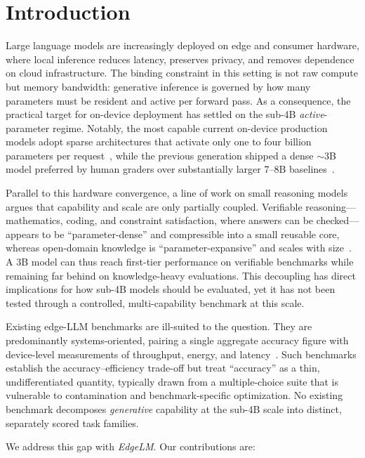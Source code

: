 \documentclass[runningheads]{llncs}
\begin{document}
\section{Introduction}

Large language models are increasingly deployed on edge and consumer
hardware, where local inference reduces latency, preserves privacy, and removes
dependence on cloud infrastructure. The binding constraint in this setting is
not raw compute but memory bandwidth: generative inference is governed by how
many parameters must be resident and active per forward pass. As a consequence,
the practical target for on-device deployment has settled on the sub-4B
\emph{active}-parameter regime. Notably, the most capable current on-device
production models adopt sparse architectures that activate only one to four
billion parameters per request~\cite{appleafm3}, while the previous generation
shipped a dense ${\sim}3$B model preferred by human graders over substantially
larger 7--8B baselines~\cite{appleafm2025}.

Parallel to this hardware convergence, a line of work on small reasoning models
argues that capability and scale are only partially coupled. Verifiable
reasoning---mathematics, coding, and constraint satisfaction, where answers can
be checked---appears to be ``parameter-dense'' and compressible into a small
reusable core, whereas open-domain knowledge is ``parameter-expansive'' and
scales with size~\cite{vibethinker2026}. A 3B model can thus reach
first-tier performance on verifiable benchmarks while remaining far behind on
knowledge-heavy evaluations. This decoupling has direct implications for how
sub-4B models should be evaluated, yet it has not been tested through a
controlled, multi-capability benchmark at this scale.

Existing edge-LLM benchmarks are ill-suited to the question. They are
predominantly systems-oriented, pairing a single aggregate accuracy figure with
device-level measurements of throughput, energy, and
latency~\cite{edgebench2026,leaf2026,rooflinebench2026}. Such benchmarks
establish the accuracy--efficiency trade-off but treat ``accuracy'' as a thin,
undifferentiated quantity, typically drawn from a multiple-choice suite that is
vulnerable to contamination and benchmark-specific optimization. No existing
benchmark decomposes \emph{generative} capability at the sub-4B scale into
distinct, separately scored task families.

We address this gap with \emph{EdgeLM}. Our contributions are:
\end{document}
